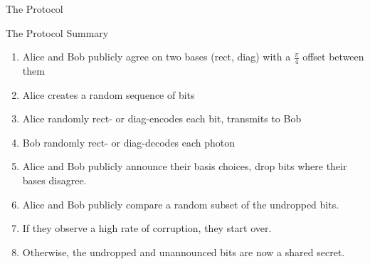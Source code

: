 \documentclass[pdf]{beamer}
\begin{document}
\begin{frame}{The Protocol}
\begin{center}
  \end{center}
  \vspace{10pt}
\end{frame}

\begin{frame}{The Protocol Summary}
  \begin{enumerate}
  \item Alice and Bob publicly agree on two bases (rect, diag) with a
    $\frac{\pi}{4}$ offset between them
  \item Alice creates a random sequence of bits
  \item Alice randomly rect- or diag-encodes each bit, transmits to Bob
  \item Bob randomly rect- or diag-decodes each photon
  \item Alice and Bob publicly announce their basis choices, drop bits where
their bases disagree.
  \item Alice and Bob publicly compare a random subset of the undropped bits.
  \item If they observe a high rate of corruption, they start over.
  \item Otherwise, the undropped and unannounced bits are now a shared secret.
  \end{enumerate}
\end{frame}
\end{document}
